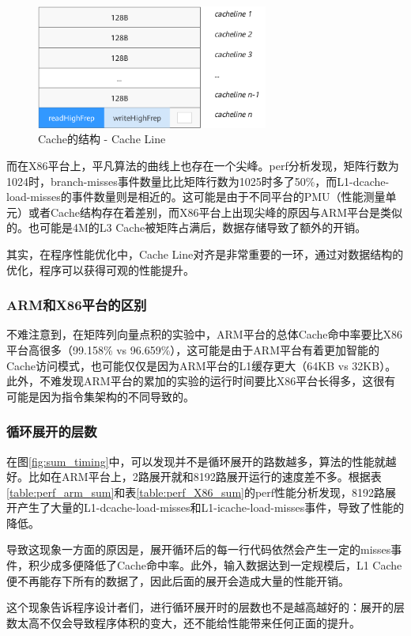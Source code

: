\documentclass[a4paper]{article}
\begin{document}
\begin{figure}[!htbp]
    \centering
    \includegraphics[width=3in]{fig/cache_line.png}
    \caption{Cache的结构 - Cache Line\cite{cacheline}}
    \label{fig:cache_line}
\end{figure}

而在X86平台上，平凡算法的曲线上也存在一个尖峰。perf分析发现，矩阵行数为1024时，branch-misses事件数量比比矩阵行数为1025时多了50\%，而L1-dcache-load-misses的事件数量则是相近的。这可能是由于不同平台的PMU（性能测量单元）或者Cache结构存在着差别，而X86平台上出现尖峰的原因与ARM平台是类似的。也可能是4M的L3 Cache被矩阵占满后，数据存储导致了额外的开销。

其实，在程序性能优化中，Cache Line对齐是非常重要的一环，通过对数据结构的优化，程序可以获得可观的性能提升。

\subsubsection{ARM和X86平台的区别}
不难注意到，在矩阵列向量点积的实验中，ARM平台的总体Cache命中率要比X86平台高很多（99.158\% vs 96.659\%），这可能是由于ARM平台有着更加智能的Cache访问模式，也可能仅仅是因为ARM平台的L1缓存更大（64KB vs 32KB）。此外，不难发现ARM平台的累加的实验的运行时间要比X86平台长得多，这很有可能是因为指令集架构的不同导致的。

\subsubsection{循环展开的层数}
在图\ref{fig:sum_timing}中，可以发现并不是循环展开的路数越多，算法的性能就越好。比如在ARM平台上，2路展开就和8192路展开运行的速度差不多。根据表\ref{table:perf_arm_sum}和表\ref{table:perf_X86_sum}的perf性能分析发现，8192路展开产生了大量的L1-dcache-load-misses和L1-icache-load-misses事件，导致了性能的降低。

导致这现象一方面的原因是，展开循环后的每一行代码依然会产生一定的misses事件，积少成多便降低了Cache命中率。此外，输入数据达到一定规模后，L1 Cache便不再能存下所有的数据了，因此后面的展开会造成大量的性能开销。

这个现象告诉程序设计者们，进行循环展开时的层数也不是越高越好的：展开的层数太高不仅会导致程序体积的变大，还不能给性能带来任何正面的提升。
\end{document}
